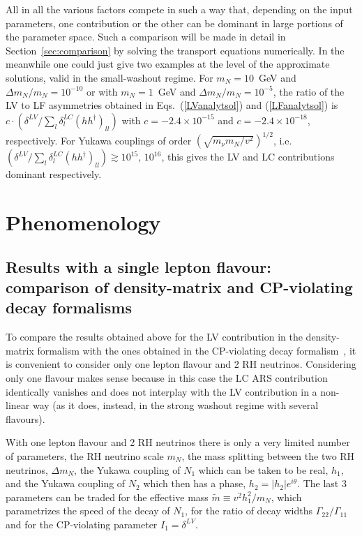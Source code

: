 \documentclass[prd,twocolumn,superscriptaddress,preprintnumbers,nofootinbib,
noshowpacs,groupedaddress]{revtex4-1} %
\begin{document}
All in all the various factors compete in such a way that, depending on the input parameters, one contribution or the other can be dominant in large portions of the parameter space. Such a comparison will be made in detail in Section~\ref{sec:comparison} by solving the transport equations numerically. In the meanwhile one could just give two examples at the level of the approximate solutions, valid in the small-washout regime. For $m_N=10$~GeV and $\Delta m_N/m_N=10^{-10}$ or with $m_N=1$~GeV and $\Delta m_N/m_N=10^{-5}$,
the ratio of the LV to LF asymmetries obtained in Eqs.~(\ref{LVanalytsol}) and (\ref{LFanalytsol}) is $c \cdot (\delta^{LV}/\sum_l \delta_l^{LC} (h h^\dag)_{ll})$ with $c=-2.4 \times 10^{-15}$ and $c=-2.4 \times 10^{-18}$, respectively. For Yukawa couplings of order $(\sqrt{m_\nu m_N/v^2})^{1/2}$, i.e.~$(\delta^{LV}/\sum_l \delta_l^{LC} (h h^\dag)_{ll}) \gtrsim 10^{15}$, $10^{16}$, this gives the LV and LC contributions dominant respectively. 

\section{Phenomenology}

\subsection{Results with a single lepton flavour: comparison of density-matrix and CP-violating decay formalisms}\label{sec:oneleptonflavour}


To compare the results obtained above for the LV contribution in the density-matrix formalism with the ones obtained in the CP-violating decay formalism~\cite{Hambye:2016sby}, it is convenient to consider only one lepton flavour and 2 RH neutrinos. Considering only one flavour makes sense because in this case the LC ARS contribution identically vanishes and does not interplay  with the LV contribution in a non-linear way (as it does, instead, in the strong washout regime with several flavours). 

With one lepton flavour and 2 RH neutrinos there is only a very limited number of parameters, the RH neutrino scale $m_N$, the mass splitting between the two RH neutrinos, $\Delta m_N$, the Yukawa coupling of $N_1$ which can be taken to be real, $h_1$, and the Yukawa coupling of $N_2$ which  then has a phase, $h_2=|h_2|e^{i\theta}$. The last 3 parameters can be traded for the effective mass $\tilde{m}\equiv v^2 h_1^2/m_N$, which parametrizes the speed of the decay of $N_1$, for the ratio of decay widths $\Gamma_{22}/\Gamma_{11}$ and for the CP-violating parameter $I_1=\delta^{LV}$.
\end{document}
